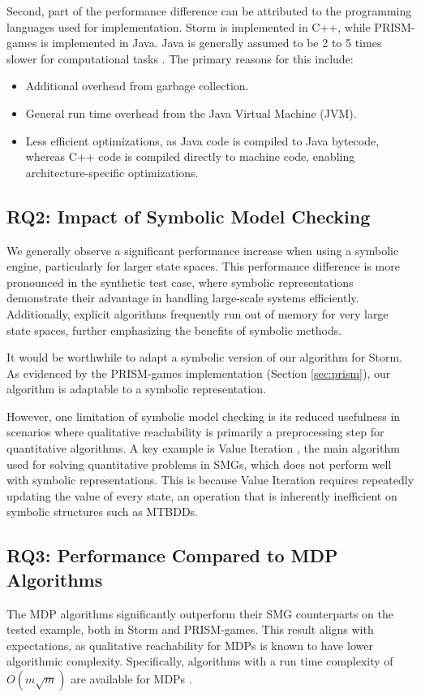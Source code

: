 Second, part of the performance difference can be attributed to the programming languages used for implementation. Storm is implemented in C++, while PRISM-games is implemented in Java. Java is generally assumed to be 2 to 5 times slower for computational tasks \cite{back_comparing_2017}. The primary reasons for this include:
\begin{itemize}
    \item Additional overhead from garbage collection.
    \item General run time overhead from the Java Virtual Machine (JVM).
    \item Less efficient optimizations, as Java code is compiled to Java bytecode, whereas C++ code is compiled directly to machine code, enabling architecture-specific optimizations.
\end{itemize}

\subsection{\textbf{RQ2}: Impact of Symbolic Model Checking}
We generally observe a significant performance increase when using a symbolic engine, particularly for larger state spaces. This performance difference is more pronounced in the synthetic test case, where symbolic representations demonstrate their advantage in handling large-scale systems efficiently. Additionally, explicit algorithms frequently run out of memory for very large state spaces, further emphasizing the benefits of symbolic methods.

It would be worthwhile to adapt a symbolic version of our algorithm for Storm. As evidenced by the PRISM-games implementation (Section \ref{sec:prism}), our algorithm is adaptable to a symbolic representation.

However, one limitation of symbolic model checking is its reduced usefulness in scenarios where qualitative reachability is primarily a preprocessing step for quantitative algorithms. A key example is Value Iteration \cite{chen_automatic_2013}, the main algorithm used for solving quantitative problems in SMGs, which does not perform well with symbolic representations. This is because Value Iteration requires repeatedly updating the value of every state, an operation that is inherently inefficient on symbolic structures such as MTBDDs.


\subsection{\textbf{RQ3}: Performance Compared to MDP Algorithms}
The MDP algorithms significantly outperform their SMG counterparts on the tested example, both in Storm and PRISM-games. This result aligns with expectations, as qualitative reachability for MDPs is known to have lower algorithmic complexity. Specifically, algorithms with a run time complexity of \(O(m \sqrt{m})\) are available for MDPs \cite{chatterjee_simple_2003}.

